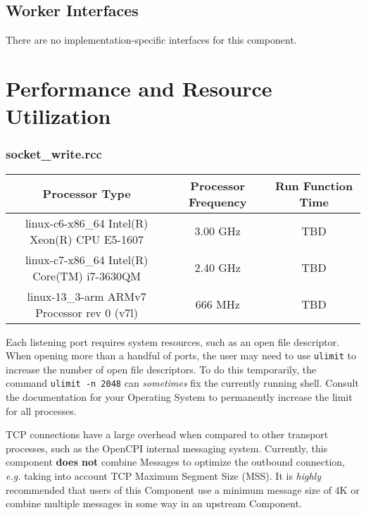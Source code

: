 \documentclass{article}
\def\comp{socket\_write}
\begin{document}
\begin{landscape}
  \section*{Worker Interfaces}
  There are no implementation-specific interfaces for this component.
\end{landscape}

\section*{Performance and Resource Utilization}

\subsubsection*{\comp.rcc}
\begin{scriptsize}
  \begin{tabular}{|c|c|c|}
    \hline
    \rowcolor{blue}
    Processor Type                                & Processor Frequency & Run Function Time \\
    \hline
    linux-c6-x86\_64 Intel(R) Xeon(R) CPU E5-1607 & 3.00 GHz            & TBD               \\
    \hline
    linux-c7-x86\_64 Intel(R) Core(TM) i7-3630QM  & 2.40 GHz            & TBD               \\
    \hline
    linux-13\_3-arm ARMv7 Processor rev 0 (v7l)    & 666 MHz             & TBD               \\
    \hline
  \end{tabular}
\end{scriptsize}
\medskip

Each listening port requires system resources, such as an open file descriptor. When opening more than a handful of ports, the user may need to use \verb+ulimit+ to increase the number of open file descriptors. To do this temporarily, the command \verb+ulimit -n 2048+ can \textit{sometimes} fix the currently running shell. Consult the documentation for your Operating System to permanently increase the limit for all processes.\\
\medskip

TCP connections have a large overhead when compared to other transport processes, such as the OpenCPI internal messaging system. Currently, this component \textbf{does not} combine Messages to optimize the outbound connection, \textit{e.g.} taking into account TCP Maximum Segment Size (MSS). It is \textit{highly} recommended that users of this Component use a minimum message size of 4K or combine multiple messages in some way in an upstream Component.
\medskip
\end{document}
